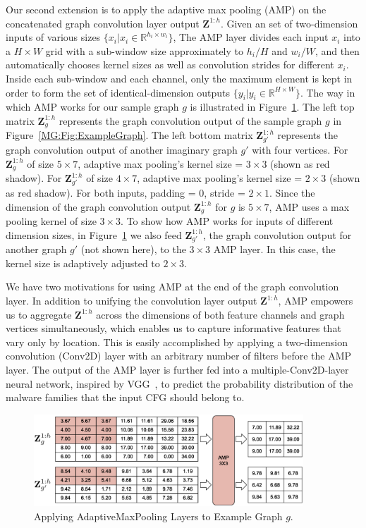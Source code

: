 Our second extension is to apply the adaptive max pooling (AMP) on the concatenated graph convolution layer output $\mathbf{Z}^{1:h}$.
Given an set of two-dimension inputs of various sizes $\{x_i | x_i \in \mathbb{R}^{h_i \times w_i}\}$,
The AMP layer divides each input $x_i$ into a $H \times W$ grid with a sub-window size approximately to $h_i / H$ and $w_i / W$,
and then automatically chooses kernel sizes as well as convolution strides for different $x_i$.
Inside each sub-window and each channel, only the maximum element is kept in order to form the set of identical-dimension outputs $\{y_i | y_i \in \mathbb{R}^{ H \times W}\}$.
The way in which AMP works for our sample graph $g$ is illustrated in Figure~\ref{MG:Fig:ExampleAmp}.
The left top matrix $\mathbf{Z}^{1:h}_g$ represents the graph convolution output of the sample graph $g$ in Figure~\ref{MG:Fig:ExampleGraph}.
The left bottom matrix $\mathbf{Z}^{1:h}_{g'}$ represents the graph convolution output of another imaginary graph $g'$ with four vertices.
For $\mathbf{Z}^{1:h}_g$ of size $5\times 7$, adaptive max pooling's kernel size = $3 \times 3$ (shown as red shadow).
For $\mathbf{Z}^{1:h}_{g'}$ of size $4\times 7$, adaptive max pooling's kernel size = $2 \times 3$ (shown as red shadow).
For both inputs, padding = 0, stride = $2 \times 1$.
Since the dimension of the graph convolution output $\mathbf{Z}^{1:h}_g$ for $g$ is $5 \times 7$, AMP uses a max pooling kernel of size $3 \times 3$.
To show how AMP works for inputs of different dimension sizes, in Figure~\ref{MG:Fig:ExampleAmp} we also feed $\mathbf{Z}^{1:h}_{g'}$,
the graph convolution output for another graph $g'$ (not shown here), to the $3 \times 3$ AMP layer.
In this case, the kernel size is adaptively adjusted to $2 \times 3$.

We have two motivations for using AMP at the end of the graph convolution layer.
In addition to unifying the convolution layer output $\mathbf{Z}^{1:h}$, AMP empowers us to aggregate $\mathbf{Z}^{1:h}$
across the dimensions of both feature channels and graph vertices simultaneously,
which enables us to capture informative features that vary only by location.
This is easily accomplished by applying a two-dimension convolution (Conv2D) layer with an arbitrary number of filters before the AMP layer.
The output of the AMP layer is further fed into a multiple-Conv2D-layer neural network, inspired by VGG~\cite{VGG}, to predict the probability distribution of the malware families that the input CFG should belong to.

\begin{figure}[htbp]
\centerline{\includegraphics[width=0.90\textwidth]{Magic/figures/ExampleAmp.eps}}
\caption{Applying AdaptiveMaxPooling Layers to Example Graph $g$.}
\label{MG:Fig:ExampleAmp}
\end{figure}
